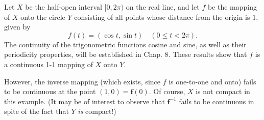 \begin{myExample}
    Let $X$ be the half-open interval $[0, 2\pi)$ on the real line, 
    and let $f$ be the mapping of $X$ onto the circle $Y$ consisting of all points 
    whose distance from the origin is $1$, given by
    \begin{equation}
        \label{eq:4.24}
        f(t) = (\cos t, \sin t)
        \quad
        (0 \leq t < 2\pi).
    \end{equation}
    The continuity of the trigonometric functions cosine and sine, 
    as well as their periodicity properties, will be established in Chap. 8. 
    These results show that $f$ is a continuous 1-1 mapping of $X$ onto $Y$.
    
    However, the inverse mapping 
    (which exists, since $f$ is one-to-one and onto) 
    fails to be continuous at the point $(1, 0) = \mathbf{f}(0)$. 
    Of course, $X$ is not compact in this example. 
    (It may be of interest to observe that 
    $\mathbf{f}^{-1}$ fails to be continuous in spite of the fact that $Y$ \emph{is} compact!)
\end{myExample}